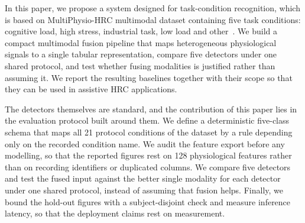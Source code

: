 \documentclass[a4paper,twoside]{article}
\begin{document}
In this paper, we propose a system designed for task-condition recognition, which is based on MultiPhysio-HRC multimodal dataset containing five task conditions: cognitive load, high stress, industrial task, low load and other~\cite{bussolan2025multiphysiohrc}. We build a compact multimodal fusion pipeline that maps heterogeneous physiological signals to a single tabular representation, compare five detectors under one shared protocol, and test whether fusing modalities is justified rather than assuming it. We report the resulting baselines together with their scope so that they can be used in assistive \ac{HRC} applications.

The detectors themselves are standard, and the contribution of this paper lies in the evaluation protocol built around them. We define a deterministic five-class schema that maps all 21 protocol conditions of the dataset by a rule depending only on the recorded condition name. We audit the feature export before any modelling, so that the reported figures rest on 128 physiological features rather than on recording identifiers or duplicated columns. We compare five detectors and test the fused input against the better single modality for each detector under one shared protocol, instead of assuming that fusion helps. Finally, we bound the hold-out figures with a subject-disjoint check and measure inference latency, so that the deployment claims rest on measurement.

\end{document}
